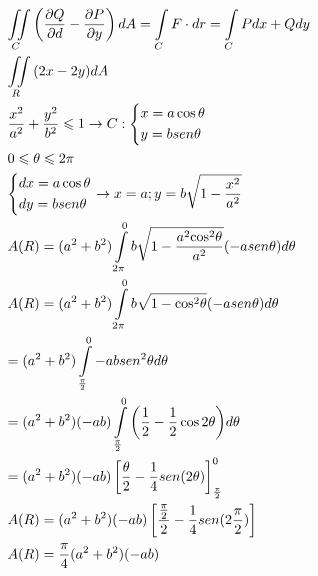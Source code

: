 \documentclass[12pt]{article}
\begin{document}
\vspace{3mm}
\[\begin{gathered}
  \iint\limits_C {\left( {\frac{{\partial Q}}{{\partial d}} - \frac{{\partial P}}{{\partial y}}} \right)dA = \int\limits_C {F \cdot dr = \int\limits_C {Pdx + Qdy} } } \hfill \\
  \iint\limits_R {(2x - 2y)dA} \hfill \\
  \frac{{{x^2}}}{{{a^2}}} + \frac{{{y^2}}}{{{b^2}}} \leqslant 1 \to C:\left\{ \begin{gathered}
  x = a\cos \theta  \hfill \\
  y = bsen\theta  \hfill \\ 
\end{gathered}  \right. \hfill \\
  0 \leqslant \theta  \leqslant 2\pi  \hfill \\
  \left\{ \begin{gathered}
  dx = a\cos \theta  \hfill \\
  dy = bsen\theta  \hfill \\ 
\end{gathered}  \right. \to x = a;y = b\sqrt {1 - \frac{{{x^2}}}{{{a^2}}}}  \hfill \\
  A(R) = ({a^2} + {b^2})\int\limits_{2\pi }^0 {b\sqrt {1 - \frac{{{a^2}{{\cos }^2}\theta }}{{{a^2}}}} ( - asen\theta )d\theta }  \hfill \\
  A(R) = ({a^2} + {b^2})\int\limits_{2\pi }^0 {b\sqrt {1 - {{\cos }^2}\theta } } ( - asen\theta )d\theta  \hfill \\
   = ({a^2} + {b^2})\int\limits_{\frac{\pi }{2}}^0 { - abse{n^2}\theta d\theta }  \hfill \\
   = ({a^2} + {b^2})( - ab)\int\limits_{\frac{\pi }{2}}^0 {\left( {\frac{1}{2} - \frac{1}{2}\cos 2\theta } \right)} d\theta  \hfill \\
   = ({a^2} + {b^2})( - ab)\left[ {\frac{\theta }{2} - \frac{1}{4}sen(2\theta )} \right]_{\frac{\pi }{2}}^0 \hfill \\
  A(R) = ({a^2} + {b^2})( - ab)\left[ {\frac{{\frac{\pi }{2}}}{2} - \frac{1}{4}sen(2\frac{\pi }{2})} \right] \hfill \\
  A(R) = \frac{\pi }{4}({a^2} + {b^2})( - ab) \hfill \\ 
\end{gathered} \]
\end{document}
